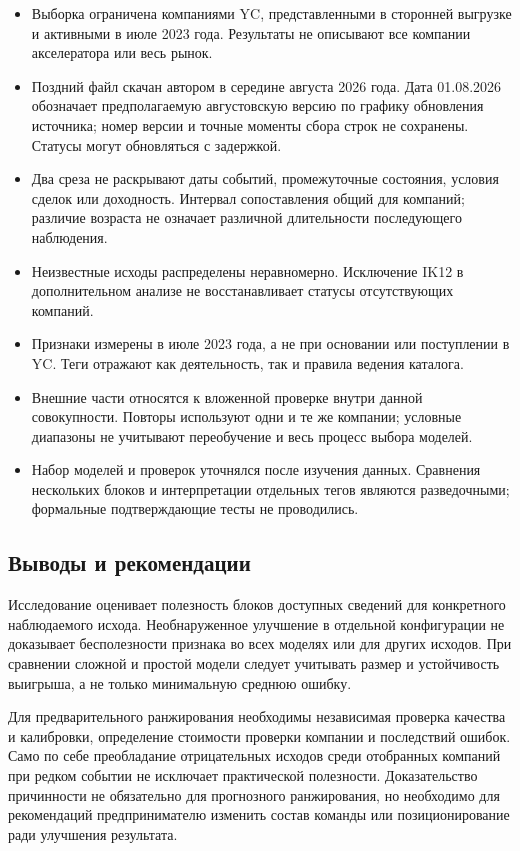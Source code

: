 \begin{itemize}
\item Выборка ограничена компаниями YC, представленными в сторонней выгрузке и активными в июле 2023 года. Результаты не описывают все компании акселератора или весь рынок.
\item Поздний файл скачан автором в середине августа 2026 года. Дата 01.08.2026 обозначает предполагаемую августовскую версию по графику обновления источника; номер версии и точные моменты сбора строк не сохранены. Статусы могут обновляться с задержкой.
\item Два среза не раскрывают даты событий, промежуточные состояния, условия сделок или доходность. Интервал сопоставления общий для компаний; различие возраста не означает различной длительности последующего наблюдения.
\item Неизвестные исходы распределены неравномерно. Исключение IK12 в дополнительном анализе не восстанавливает статусы отсутствующих компаний.
\item Признаки измерены в июле 2023 года, а не при основании или поступлении в YC. Теги отражают как деятельность, так и правила ведения каталога.
\item Внешние части относятся к вложенной проверке внутри данной совокупности. Повторы используют одни и те же компании; условные диапазоны не учитывают переобучение и весь процесс выбора моделей.
\item Набор моделей и проверок уточнялся после изучения данных. Сравнения нескольких блоков и интерпретации отдельных тегов являются разведочными; формальные подтверждающие тесты не проводились.
\end{itemize}

\subsection{Выводы и рекомендации}

Исследование оценивает полезность блоков доступных сведений для конкретного наблюдаемого исхода. Необнаруженное улучшение в отдельной конфигурации не доказывает бесполезности признака во всех моделях или для других исходов. При сравнении сложной и простой модели следует учитывать размер и устойчивость выигрыша, а не только минимальную среднюю ошибку.

Для предварительного ранжирования необходимы независимая проверка качества и калибровки, определение стоимости проверки компании и последствий ошибок. Само по себе преобладание отрицательных исходов среди отобранных компаний при редком событии не исключает практической полезности. Доказательство причинности не обязательно для прогнозного ранжирования, но необходимо для рекомендаций предпринимателю изменить состав команды или позиционирование ради улучшения результата.

